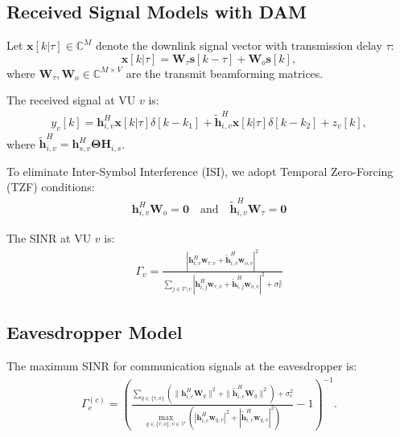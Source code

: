 \documentclass[journal]{IEEEtran}
\begin{document}
\subsection{Received Signal Models with DAM}

Let $\mathbf{x}[k|\tau] \in \mathbb{C}^{M}$ denote the downlink signal vector with transmission delay $\tau$:
\begin{equation}\label{Eqn:TranSigIAB}
    \mathbf{x}[k|\tau] = \mathbf{W}_{\tau} \mathbf{s}[k - \tau] + \mathbf{W}_{o} \mathbf{s}[k],
\end{equation}
where $\mathbf{W}_{\tau}, \mathbf{W}_{o} \in \mathbb{C}^{M \times V}$ are the transmit beamforming matrices.

The received signal at VU $v$ is:
\begin{align}\label{Eqn:RecSigUV}
    y_v[k] = \mathbf{h}_{i,v}^H \mathbf{x}[k|\tau] \delta[k-k_1] + \tilde{\mathbf{h}}_{i,v}^H\mathbf{x}[k|\tau] \delta[k-k_2] + z_v[k], 
\end{align}
where $\tilde{\mathbf{h}}_{i,v}^H = {\mathbf{h}}_{s,v}^{H} \boldsymbol{\Theta} {\mathbf{H}}_{i,s}$.

To eliminate Inter-Symbol Interference (ISI), we adopt Temporal Zero-Forcing (TZF) conditions:
\begin{align}\label{Eqn:ZFcond}
\mathbf{h}_{i,v}^H \mathbf{W}_{o} = \mathbf{0} \quad\text{and}\quad 
\tilde{\mathbf{h}}_{i,v}^H\mathbf{W}_{\tau} = \mathbf{0}
\end{align}

The SINR at VU $v$ is:
\begin{align}\label{Eqn:SINRv}
\Gamma_v = \frac{|\mathbf{h}_{i,v}^H\mathbf{w}_{\tau,v}+ \tilde{\mathbf{h}}_{i,v}^H\mathbf{w}_{o,v}|^2}{\sum_{j\in\mathcal{V}\setminus v}|\mathbf{h}_{i,j}^H\mathbf{w}_{\tau,v}+ \tilde{\mathbf{h}}_{i,j}^H\mathbf{w}_{o,v}|^2+\sigma_v^2}
\end{align}

\subsection{Eavesdropper Model}

The maximum SINR for communication signals at the eavesdropper is:
\begin{align}\label{Eqn:SINR_Eve}
\Gamma^{(c)}_e = \left(\frac{\sum_{q\in\{\tau,o\}}(\|\mathbf{h}^H_{i,e}\mathbf{W}_q\|^2+\|\tilde{\mathbf{h}}^H_{i,e}\mathbf{W}_q\|^2)+\sigma^2_e}{\max_{ q\in\{\tau,o\},v\in\mathcal{V}} (|\mathbf{h}^H_{i,e}\mathbf{w}_{q,v}|^2+|\tilde{\mathbf{h}}^H_{i,e}\mathbf{w}_{q,v}|^2)}-1\right)^{-1}.
\end{align}
\end{document}
